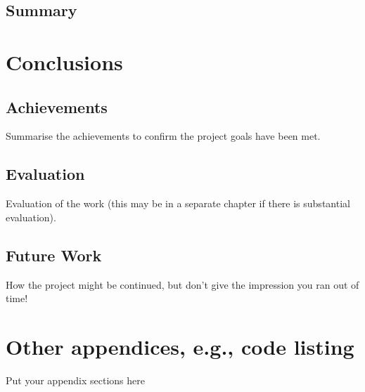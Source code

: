 \documentclass[a4paper]{report}
\begin{document}
\section{Summary}

\chapter{Conclusions}

\section{Achievements}
Summarise the achievements to confirm the project goals have been met.
\section{Evaluation}
Evaluation of the work (this may be in a separate chapter if there is substantial evaluation).

\section{Future Work}
How the project might be continued, but don't give the impression you ran out of time!

\appendix


\chapter{Other appendices, e.g., code listing}
Put your appendix sections here
\end{document}
